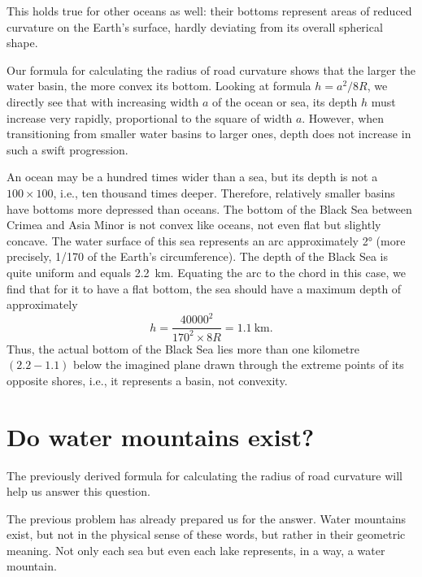 This holds true for other oceans as well: their bottoms represent areas of reduced curvature on the Earth's surface, hardly deviating from its overall spherical shape.

Our formula for calculating the radius of road curvature shows that the larger the water basin, the more convex its bottom. Looking at formula $h = a^{2}/8R$, we directly see that with increasing width $a$ of the ocean or sea, its depth $h$ must increase very rapidly, proportional to the square of width $a$. However, when transitioning from smaller water basins to larger ones, depth does not increase in such a swift progression. 

An ocean may be a hundred times wider than a sea, but its depth is not a $100 \times 100$, i.e., ten thousand times deeper. Therefore, relatively smaller basins have bottoms more depressed than oceans. The bottom of the Black Sea between Crimea and Asia Minor is not convex like oceans, not even flat but slightly concave. The water surface of this sea represents an arc approximately \ang{2} (more precisely, 1/170 of the Earth's circumference). The depth of the Black Sea is quite uniform and equals \SI{2.2}{\kilo\meter}. Equating the arc to the chord in this case, we find that for it to have a flat bottom, the sea should have a maximum depth of approximately 
\begin{equation*}%
h = \frac{40000^{2}}{ 170^{2} \times 8R} = \SI{1.1}{\kilo\meter}.
\end{equation*}
Thus, the actual bottom of the Black Sea lies more than one kilometre $(2.2 - 1.1)$ below the imagined plane drawn through the extreme points of its opposite shores, i.e., it represents a basin, not convexity.


\section{Do water mountains exist?}
\label{sec-4.9}


The previously derived formula for calculating the radius of road curvature will help us answer this question.

The previous problem has already prepared us for the answer. Water mountains exist, but not in the physical sense of these words, but rather in their geometric meaning. Not only each sea but even each lake represents, in a way, a water mountain. 

